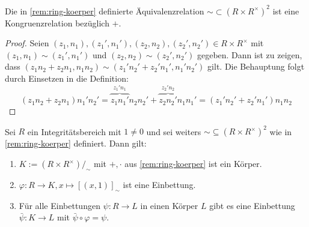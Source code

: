 \begin{lemma}
    Die in \cref{rem:ring-koerper} definierte Äquivalenzrelation $\sim \subset (R \times R^\times)^2$ ist eine Kongruenzrelation bezüglich $+$.
\end{lemma}

\begin{proof}
    Seien $(z_1,n_1),(z_1',n_1'),(z_2,n_2),(z_2',n_2')\in R\times R^\times$ mit $(z_1,n_1)\sim (z_1',n_1')$ und $(z_2,n_2)\sim (z_2',n_2')$ gegeben.
    Dann ist zu zeigen, dass $(z_1n_2+z_2n_1,n_1n_2)\sim (z_1'n_2'+z_2'n_1',n_1'n_2')$ gilt. Die Behauptung folgt durch Einsetzen
    in die Definition:
    $$(z_1n_2+z_2n_1)n_1'n_2'=\overbrace{z_1n_1'}^{z_1'n_1}n_2n_2'+\overbrace{z_2n_2'}^{z_2'n_2}n_1n_1'=(z_1'n_2'+z_2'n_1')n_1n_2$$
\end{proof}

\begin{theorem}\label{theorem:Quotientenkoerper}
    Sei $R$ ein Integritätsbereich mit $1 \neq 0$ und sei weiters $\sim \subseteq (R \times R^\times)^2$ wie in \cref{rem:ring-koerper} definiert. Dann gilt:
    \begin{enumerate}
        \item $K := (R \times R^\times)/_\sim $ mit $+, \cdot$ aus \cref{rem:ring-koerper} ist ein Körper.
        \item $\varphi : R \to K, x \mapsto [(x, 1)]_\sim$ ist eine Einbettung.
        \item Für alle Einbettungen $\psi : R \to L$ in einen Körper $L$ gibt es eine Einbettung $\bar{\psi} : K \to L$ mit $\bar{\psi} \circ \varphi = \psi$.
    \end{enumerate}
\end{theorem}

